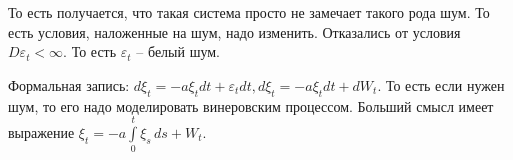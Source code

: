 То есть получается, что такая система просто не замечает такого рода шум. То есть условия, наложенные
на шум, надо изменить. Отказались от условия $D\varepsilon_t < \infty$.
То есть $\varepsilon_t$ -- белый шум.

Формальная запись:
$d\xi_t = - a\xi_t dt + \varepsilon_t dt, d\xi_t = -a \xi_t dt + dW_t$. То есть если нужен шум,
то его надо моделировать винеровским процессом. Больший смысл имеет выражение $\xi_t = - a \int\limits_0^t \xi_s \, ds + W_t$.
